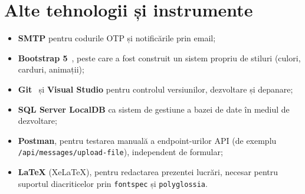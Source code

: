 \section{Alte tehnologii și instrumente}

\begin{itemize}
    \item \textbf{SMTP} pentru codurile OTP și notificările prin email;
    \item \textbf{Bootstrap 5}~\cite{bootstrap-docs}, peste care a fost construit
    un sistem propriu de stiluri (culori, carduri, animații);
    \item \textbf{Git}~\cite{git-docs} și \textbf{Visual Studio} pentru controlul
    versiunilor, dezvoltare și depanare;
    \item \textbf{SQL Server LocalDB} ca sistem de gestiune a bazei de date în
    mediul de dezvoltare;
    \item \textbf{Postman}, pentru testarea manuală a endpoint-urilor API (de
    exemplu \texttt{/api/messages/upload-file}), independent de formular;
    \item \textbf{LaTeX} (XeLaTeX), pentru redactarea prezentei lucrări, necesar
    pentru suportul diacriticelor prin \texttt{fontspec} și \texttt{polyglossia}.
\end{itemize}
